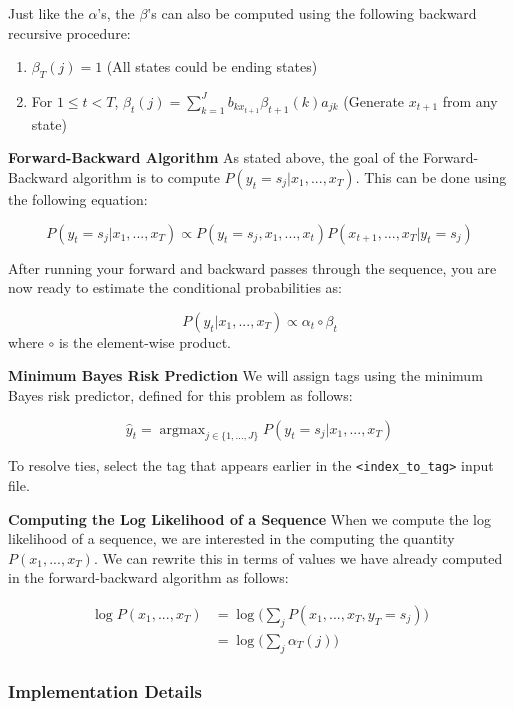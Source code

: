 \documentclass{article}
\newcommand{\argmax}{\mathop{\mathrm{argmax}}}
\begin{document}
Just like the $\alpha$'s, the $\beta$'s can also be computed using the following backward recursive procedure:

\begin{enumerate}
    \item $\beta_T(j) = 1$ (All states could be ending states)
    \item  For $1\leq t <T$, $\beta_t(j) = \sum_{k=1}^{J}b_{kx_{t+1}}\beta_{t+1}(k)a_{jk}$ (Generate $x_{t+1}$ from any state)
\end{enumerate}


\textbf{Forward-Backward Algorithm}
As stated above, the goal of the Forward-Backward algorithm is to compute $P(y_t =s_j | x_1,...,x_T)$. This can be done using the following equation:

$$P(y_t =s_j | x_1,...,x_T) \propto P(y_t=s_j, x_1,...,x_{t})P(x_{t+1},...,x_T|y_t=s_j) $$

After running your forward and backward passes through the sequence, you are now ready to estimate the conditional probabilities as:

$$P(y_t | x_1,...,x_T) \propto \alpha_t\circ\beta_t$$
where $\circ$ is the element-wise product.

\textbf{Minimum Bayes Risk Prediction}
We will assign tags using the minimum Bayes risk predictor, defined for this problem as follows:

$$\hat{y}_t = \argmax_{j\in \{1,...,J\}} P(y_t = s_j\vert x_1,...,x_T)$$

To resolve ties, select the tag that appears earlier in the \texttt{<index\_to\_tag>} input file.

\textbf{Computing the Log Likelihood of a Sequence}
When we compute the log likelihood of a sequence, we are interested in the computing the quantity $P(x_1,...,x_T)$. We can rewrite this in terms of values we have already computed in the forward-backward algorithm as follows:

\begin{align*}
    \log P(x_1,...,x_T) &= \log\big(\sum_j P(x_1,...,x_T,y_T=s_j)\big)\\
    &= \log\big(\sum_j \alpha_T(j)\big)
\end{align*}

%

\subsubsection{Implementation Details}
\end{document}
